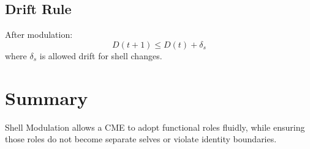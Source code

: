 \subsection{Drift Rule}

After modulation:
\[
D(t+1) \le D(t) + \delta_s
\]
where $\delta_s$ is allowed drift for shell changes.

\section{Summary}

Shell Modulation allows a CME to adopt functional roles fluidly, while
ensuring those roles do not become separate selves or violate identity boundaries.
